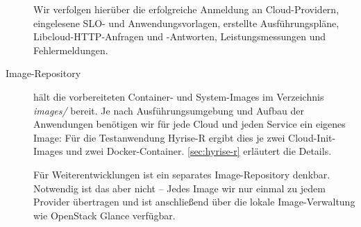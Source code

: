 \begin{description}
	Wir verfolgen hierüber die erfolgreiche Anmeldung an Cloud-Providern, eingelesene SLO- und Anwendungsvorlagen, erstellte Ausführungspläne, Libcloud-HTTP-Anfragen und -Antworten, Leistungsmessungen und Fehlermeldungen.	
	
	\item[Image-Repository] hält die vorbereiteten Container- und System-Images im Verzeichnis \emph{images/} bereit. Je nach Ausführungsumgebung und Aufbau der Anwendungen benötigen wir für jede Cloud und jeden Service ein eigenes Image: Für die Testanwendung Hyrise-R ergibt dies je zwei Cloud-Init-Images und zwei Docker-Container. \autoref{sec:hyrise-r} erläutert die Details.
	
	Für Weiterentwicklungen ist ein separates Image-Repository denkbar. Notwendig ist das aber nicht -- Jedes Image wir nur einmal zu jedem Provider übertragen und ist anschließend über die lokale Image-Verwaltung wie OpenStack Glance verfügbar.%
	
\end{description}